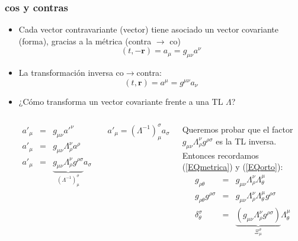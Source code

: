 \documentclass[xetex,mathserif,serif,10pt]{beamer}
\begin{document}
\begin{frame}
	\frametitle{cos y contras}
  \begin{itemize}
    \item Cada vector contravariante (vector) tiene asociado un vector covariante (forma), gracias a la métrica (contra $\to$ co)
      \begin{equation}
         (t,-\mathbf{r}) = a_\mu = g_{\mu\nu} a^\nu
      \end{equation}
    \item La transformación inversa co$\to$contra:
      \begin{equation}
        (t,\mathbf{r}) = a^\mu = g^{\mu\nu} a_\nu
      \end{equation}
    \item ¿Cómo transforma un vector covariante frente a una TL $\Lambda$?\\
      \begin{columns}
        \begin{eqnarray}
          a'_\mu &=& g_{\mu\nu} a'^\nu \nonumber\\ 
          a'_\mu &=& g_{\mu\nu} \Lambda^{\nu}_{\rho} a^\rho \nonumber\\
          a'_\mu &=& \underbrace{g_{\mu\nu} \Lambda^{\nu}_{\rho} g^{\rho\sigma}}_{\left ( \Lambda^{-1} \right )^\sigma_\mu} a_\sigma \nonumber
        \end{eqnarray}
        \vspace{-2em}
        \begin{alertblock}{}
          \begin{equation}
            a'_\mu = \left ( \Lambda^{-1} \right )^\sigma_\mu a_\sigma
          \end{equation}
        \end{alertblock}
        {\small{Queremos probar que el factor $g_{\mu\nu} \Lambda^{\nu}_{\rho} g^{\rho\sigma}$ es la TL inversa.}}
        {\small{Entonces recordamos (\ref{EQmetrica}) y (\ref{EQorto}):}}
        \begin{eqnarray}
          g_{\rho\theta} &=& g_{\mu\nu} \Lambda^{\nu}_{\rho} \Lambda^{\mu}_{\theta} \nonumber\\
          g_{\rho\theta} g^{\rho\sigma} &=& g_{\mu\nu} \Lambda^{\nu}_{\rho} \Lambda^{\mu}_{\theta}  g^{\rho\sigma} \nonumber \\
          \delta^{\sigma}_{\theta} &=& \underbrace{\left ( g_{\mu\nu} \Lambda^{\nu}_{\rho}  g^{\rho\sigma} \right )}_{\Xi^\sigma_\mu} \Lambda^{\mu}_{\theta} \nonumber \\

\end{eqnarray}
\end{columns}
\end{itemize}
\end{frame}
\end{document}
